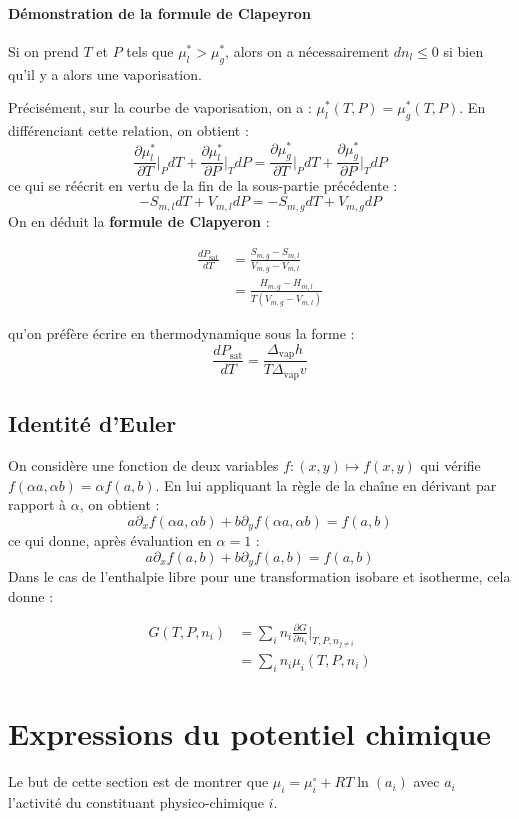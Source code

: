\documentclass[french]{book}
\theoremstyle{plain}
\theoremstyle{definition}
\theoremstyle{remark}
\newcommand{\st}{^*}
\begin{document}
\paragraph{Démonstration de la formule de Clapeyron} Si on prend $T$ et $P$ tels que $\mu_l\st>\mu_g\st$, alors on a nécessairement $dn_l\leqslant0$ si bien qu'il y a alors une vaporisation. \\ \par Précisément, sur la courbe de vaporisation, on a : $\mu_l\st(T,P)=\mu_g\st(T,P)$. En différenciant cette relation, on obtient : $$\frac{\partial \mu_l\st}{\partial T}\bigg|_PdT+\frac{\partial \mu_l\st}{\partial P}\bigg|_TdP=  \frac{\partial \mu_g\st}{\partial T}\bigg|_PdT+\frac{\partial \mu_g\st}{\partial P}\bigg|_TdP$$ ce qui se réécrit en vertu de la fin de la sous-partie précédente : $$-S_{m,l}dT+V_{m,l}dP=-S_{m,g}dT+V_{m,g}dP$$ On en déduit la \textbf{formule de Clapyeron} : 
\begin{center}
	\begin{align*}
		\frac{dP_\text{sat}}{dT}&=\frac{S_{m,g}-S_{m,l}}{V_{m,g}-V_{m,l}} \\
		&=\frac{H_{m,g}-H_{m,l}}{T(V_{m,g}-V_{m,l})}
	\end{align*}
\end{center} qu'on préfère écrire en thermodynamique sous la forme : $$\frac{dP_\text{sat}}{dT}=\frac{\Delta_\text{vap}h}{T\Delta_\text{vap}v}$$
\subsection{Identité d'Euler}
On considère une fonction de deux variables $f:(x,y)\mapsto f(x,y)$ qui vérifie $f(\alpha a,\alpha b)=\alpha f(a,b)$. En lui appliquant la règle de la chaîne en dérivant par rapport à $\alpha$, on obtient : $$a\partial_x f(\alpha a,\alpha b)+b\partial_y f(\alpha a,\alpha b)=f(a,b)$$ ce qui donne, après évaluation en $\alpha=1$ : $$a\partial_x f(a,b)+b\partial_y f(a,b)=f(a,b)$$
Dans le cas de l'enthalpie libre pour une transformation isobare et isotherme, cela donne :
\begin{center}
	\begin{align*}
		G(T,P,n_i)&=\sum_i n_i\frac{\partial G}{\partial n_i}\bigg|_{T,P,n_{j\ne i}} \\
		&=\sum_i n_i\mu_i(T,P,n_{i})
	\end{align*}
\end{center}
\section{Expressions du potentiel chimique}
Le but de cette section est de montrer que $\mu_i=\mu_i^\circ+RT\ln(a_i)$ avec $a_i$ l'activité du constituant physico-chimique $i$.
\end{document}
